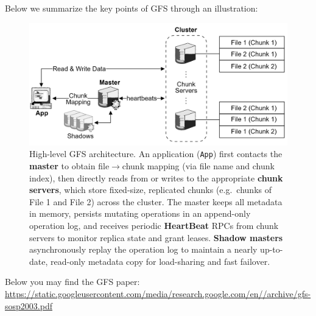 \newpage 

\noindent
Below we summarize the key points of GFS through an illustration:
\begin{figure}[h]
  \centering
  \includegraphics[width=\textwidth]{Sections/gfs/high.png}
  \caption{High-level GFS architecture. An application (\texttt{App}) first contacts the \textbf{master} to obtain file$\to$chunk mapping (via file name and chunk index), then directly reads from or writes to the appropriate \textbf{chunk servers}, 
  which store fixed-size, replicated chunks (e.g.\ chunks of File 1 and File 2) across the cluster. The master keeps all metadata in memory, persists mutating operations in an append-only operation log, and receives periodic \textbf{HeartBeat} RPCs from chunk servers to monitor 
  replica state and grant leases. \textbf{Shadow masters} asynchronously replay the operation log to maintain a nearly up-to-date, read-only metadata copy for load-sharing and fast failover.}
  \label{fig:gfs-summary}
\end{figure}


\noindent
Below you may find the GFS paper:\\
\href{https://static.googleusercontent.com/media/research.google.com/en//archive/gfs-sosp2003.pdf}{https://static.googleusercontent.com/media/research.google.com/en//archive/gfs-sosp2003.pdf}

